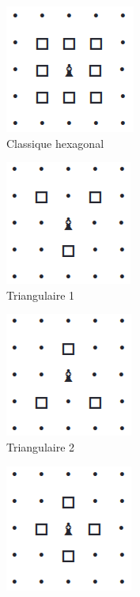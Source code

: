          \begin{figure}[H]
            \centering
            \begin{subfigure}{0.22\textwidth}
                \centering
                \includegraphics[scale= 0.35]{img/dep_hexagonal.png}
                \caption{Classique hexagonal}
                \label{fig:dep_hexa}
            \end{subfigure}
            \quad
            \begin{subfigure}{0.2\textwidth}
                \centering
                \includegraphics[scale= 0.35]{img/dep_triangle_1.png}
                \caption{Triangulaire 1}
                \label{fig:dep_tri1}
            \end{subfigure}
            \quad 
            \begin{subfigure}{0.2\textwidth}
                \centering
                \includegraphics[scale= 0.35]{img/dep_triangle_2.png}
                \caption{ Triangulaire 2}
                \label{fig:de_triangulaire 2}
            \end{subfigure}
            \label{label_de_la_figure 3}
            \quad 
             \begin{subfigure}{0.2\textwidth}
                \centering
                \includegraphics[scale= 0.35]{img/dep_carre.png}

\end{subfigure}
\end{figure}
